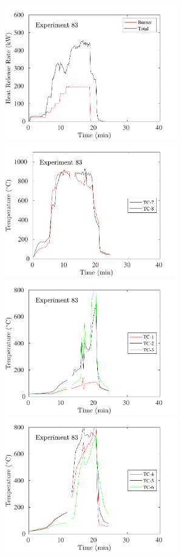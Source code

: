 \begin{figure}[H]
\includegraphics[height=2.30in]{../SCRIPT_FIGURES/Test_83_HRR} \hfill
\includegraphics[height=2.30in]{../SCRIPT_FIGURES/Test_83_TC_7-8} \\
\includegraphics[height=2.30in]{../SCRIPT_FIGURES/Test_83_TC_1-3} \hfill
\includegraphics[height=2.30in]{../SCRIPT_FIGURES/Test_83_TC_4-6}

\end{figure}
